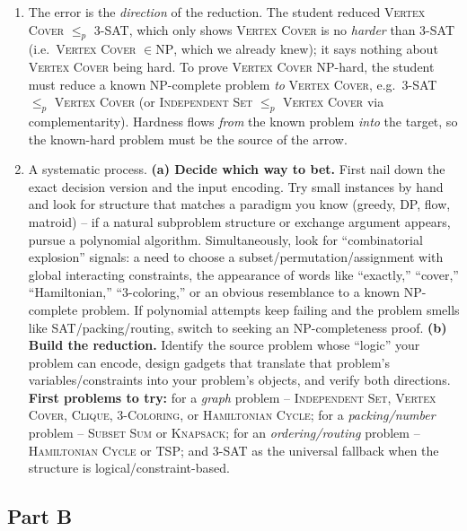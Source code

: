 \documentclass[11pt]{article}
\begin{document}
\begin{enumerate}[label=\textbf{A\arabic*.}, leftmargin=2.2em]
\item The error is the \emph{direction} of the reduction. The student reduced \textsc{Vertex
Cover} $\le_p$ \textsc{3-SAT}, which only shows \textsc{Vertex Cover} is no \emph{harder}
than \textsc{3-SAT} (i.e.\ \textsc{Vertex Cover} $\in \mathrm{NP}$, which we already knew);
it says nothing about \textsc{Vertex Cover} being hard. To prove \textsc{Vertex Cover}
NP-hard, the student must reduce a known NP-complete problem \emph{to} \textsc{Vertex
Cover}, e.g.\ \textsc{3-SAT} $\le_p$ \textsc{Vertex Cover} (or \textsc{Independent Set}
$\le_p$ \textsc{Vertex Cover} via complementarity). Hardness flows \emph{from} the known
problem \emph{into} the target, so the known-hard problem must be the source of the arrow.

\item A systematic process. \textbf{(a) Decide which way to bet.} First nail down the exact
decision version and the input encoding. Try small instances by hand and look for structure
that matches a paradigm you know (greedy, DP, flow, matroid) -- if a natural subproblem
structure or exchange argument appears, pursue a polynomial algorithm. Simultaneously, look
for ``combinatorial explosion'' signals: a need to choose a subset/permutation/assignment
with global interacting constraints, the appearance of words like ``exactly,'' ``cover,''
``Hamiltonian,'' ``3-coloring,'' or an obvious resemblance to a known NP-complete problem.
If polynomial attempts keep failing and the problem smells like SAT/packing/routing, switch
to seeking an NP-completeness proof. \textbf{(b) Build the reduction.} Identify the source
problem whose ``logic'' your problem can encode, design gadgets that translate that
problem's variables/constraints into your problem's objects, and verify both directions.
\textbf{First problems to try:} for a \emph{graph} problem -- \textsc{Independent Set},
\textsc{Vertex Cover}, \textsc{Clique}, \textsc{3-Coloring}, or \textsc{Hamiltonian Cycle};
for a \emph{packing/number} problem -- \textsc{Subset Sum} or \textsc{Knapsack}; for an
\emph{ordering/routing} problem -- \textsc{Hamiltonian Cycle} or \textsc{TSP}; and
\textsc{3-SAT} as the universal fallback when the structure is logical/constraint-based.

\end{enumerate}

\subsection*{Part B}
\end{document}
